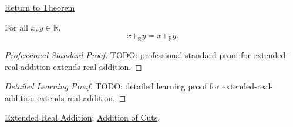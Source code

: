 \newpage
{}
\label{prf:extended-real-addition-extends-real-addition}
\begin{remark*}[Return]
\hyperref[thm:extended-real-addition-extends-real-addition]{Return to Theorem}
\end{remark*}
\begin{theorem*}
For all $x,y\in\mathbb{R}$,
\[
x+_{\overline{\mathbb{R}}}y=x+_{\mathbb{R}}y.
\]
\end{theorem*}
\begin{proof}[Professional Standard Proof]
\LRAProofBodyStart
TODO: professional standard proof for extended-real-addition-extends-real-addition.
\end{proof}
\begin{proof}[Detailed Learning Proof]
\LRAProofBodyStart
TODO: detailed learning proof for extended-real-addition-extends-real-addition.
\end{proof}
\begin{remark*}
\end{remark*}
\begin{dependencies}
\hyperref[def:extended-real-addition]{Extended Real Addition};
\hyperref[def:addition-on-r]{Addition of Cuts}.
\end{dependencies}
\clearpage
